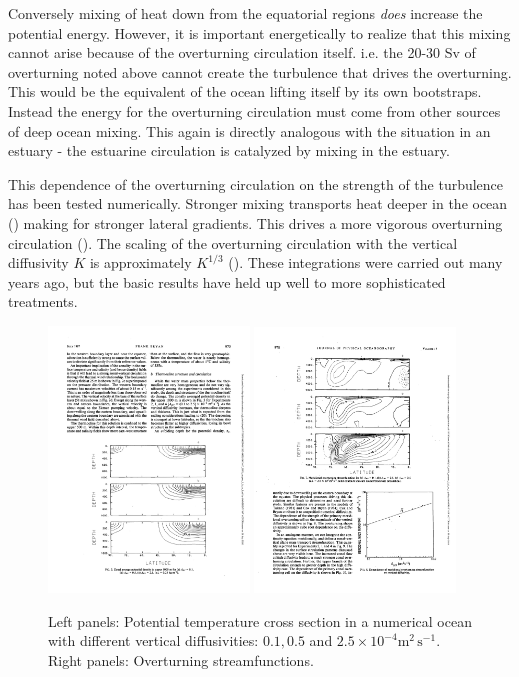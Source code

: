 Conversely mixing of heat down from the equatorial regions \emph{does} increase the potential energy.  However, it is important energetically to realize that this mixing cannot arise because of the overturning circulation itself.  i.e. the 20-30 Sv of overturning noted above cannot create the turbulence that drives the overturning.  This would be the equivalent of the ocean lifting itself by its own bootstraps.  Instead the energy for the overturning circulation must come from other sources of deep ocean mixing.  This again is directly analogous with the situation in an estuary - the estuarine circulation is catalyzed by mixing in the estuary.

This dependence of the overturning circulation on the strength of the turbulence has been tested numerically.  Stronger mixing transports heat deeper in the ocean () making for stronger lateral gradients.  This drives a more vigorous overturning circulation ().  The scaling of the overturning circulation with the vertical diffusivity $K$ is approximately $K^{1/3}$ ().  These integrations were carried out many years ago, but the basic results have held up well to more sophisticated treatments.  

\begin{figure}[hbt]
  \begin{center}
  \includegraphics[width=2.1in]{figs/WaterMasses/Bryan87Fig3}  \includegraphics[width=2.1in]{figs/WaterMasses/Bryan87Fig7}
      \caption{Left panels: Potential temperature cross section in a numerical ocean with different vertical diffusivities: $0.1, 0.5$ and $2.5\times10^{-4}\mathrm{m^2\,s^{-1}}$.  Right panels: Overturning streamfunctions.  \citep{bryan87}}
    \label{fig:Bryan87Fig3}  
  \end{center}
\end{figure}

